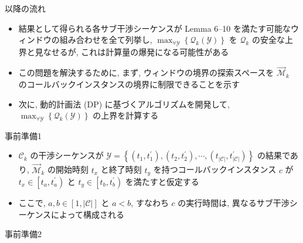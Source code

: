 \begin{frame}{以降の流れ}
    \begin{itemize}
        \item 結果として得られる各サブ干渉シーケンスが Lemma 6--10 を満たす可能なウィンドウの組み合わせを全て列挙し, $\max _{\forall \mathcal{Y}}\left\{\mathcal{Q}_{k}(\mathcal{Y})\right\}$ を $\mathcal{Q}_{k}$ の安全な上界と見なせるが, これは計算量の爆発になる可能性がある
        \item この問題を解決するために, まず, ウィンドウの境界の探索スペースを $\overrightarrow{\mathcal{M}}_{k}$ のコールバックインスタンスの境界に制限できることを示す
        \item 次に, 動的計画法 (DP) に基づくアルゴリズムを開発して, $\max _{\forall \mathcal{Y}}\left\{\mathcal{Q}_{k}(\mathcal{Y})\right\}$ の上界を計算する
    \end{itemize}
\end{frame}

\begin{frame}{事前準備1}
    \begin{itemize}
        \item $\mathcal{C}_{k}$ の干渉シーケンスが $\mathcal{Y}=\left\{\left(t_{1}, t_{1}^{\prime}\right),\left(t_{2}, t_{2}^{\prime}\right), \cdots,\left(t_{|\mathcal{C}|}, t_{|\mathcal{C}|}^{\prime}\right)\right\}$ の結果であり, $\overrightarrow{\mathcal{M}}_{k}$ の開始時刻 $t_{x}$ と終了時刻 $t_{y}$ を持つコールバックインスタンス $c$ が $t_{x} \in\left[t_{a}, t_{a}^{\prime}\right)$ と $t_{y} \in\left[t_{b}, t_{b}^{\prime}\right)$ を満たすと仮定する
        \item ここで, $a, b \in[1,|\mathcal{C}|]$ と $a<b$, すなわち $c$ の実行時間は, 異なるサブ干渉シーケンスによって構成される
    \end{itemize}
\end{frame}

\begin{frame}{事前準備2}
\end{frame}

